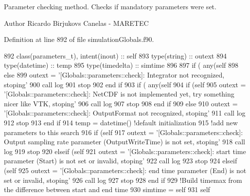 Parameter checking method. Checks if mandatory parameters were set. 

\begin{DoxyAuthor}{Author}
Ricardo Birjukovs Canelas -\/ M\+A\+R\+E\+T\+EC 
\end{DoxyAuthor}


Definition at line 892 of file simulation\+Globals.\+f90.


\begin{DoxyCode}
892     \textcolor{keywordtype}{class}(parameters\_t), \textcolor{keywordtype}{intent(inout)} :: self
893     \textcolor{keywordtype}{type}(string) :: outext
894     \textcolor{keywordtype}{type}(datetime) :: temp
895     \textcolor{keywordtype}{type}(timedelta) :: simtime
896 
897     \textcolor{keywordflow}{if} ( any(self%
898     \textcolor{keywordflow}{else}
899         outext = \textcolor{stringliteral}{'[Globals::parameters::check]: Integrator not recognized, stoping'}
900         \textcolor{keyword}{call }log%
901         stop
902 \textcolor{keywordflow}{    end if}
903     \textcolor{keywordflow}{if} ( any(self%
904         \textcolor{keywordflow}{if} (self%
905             outext = \textcolor{stringliteral}{'[Globals::parameters::check]: NetCDF is not implemented yet, try something nicer like
       VTK, stoping'}
906             \textcolor{keyword}{call }log%
907             stop
908 \textcolor{keywordflow}{        end if}
909     \textcolor{keywordflow}{else}
910         outext = \textcolor{stringliteral}{'[Globals::parameters::check]: OutputFormat not recognized, stoping'}
911         \textcolor{keyword}{call }log%
912         stop
913 \textcolor{keywordflow}{    end if}
914     temp = datetime() \textcolor{comment}{!default initialization}
915     \textcolor{comment}{!add new parameters to this search}
916     \textcolor{keywordflow}{if} (self%
917         outext = \textcolor{stringliteral}{'[Globals::parameters::check]: Output sampling rate parameter (OutputWriteTime) is not
       set, stoping'}
918         \textcolor{keyword}{call }log%
919         stop
920     \textcolor{keywordflow}{elseif} (self%
921         outext = \textcolor{stringliteral}{'[Globals::parameters::check]: start time parameter (Start) is not set or invalid,
       stoping'}
922         \textcolor{keyword}{call }log%
923         stop
924     \textcolor{keywordflow}{elseif} (self%
925         outext = \textcolor{stringliteral}{'[Globals::parameters::check]: end time parameter (End) is not set or invalid, stoping'}
926         \textcolor{keyword}{call }log%
927         stop
928 \textcolor{keywordflow}{    end if}
929     \textcolor{comment}{!Build timemax from the difference between start and end time}
930     simtime = self%
931     self%
\end{DoxyCode}
